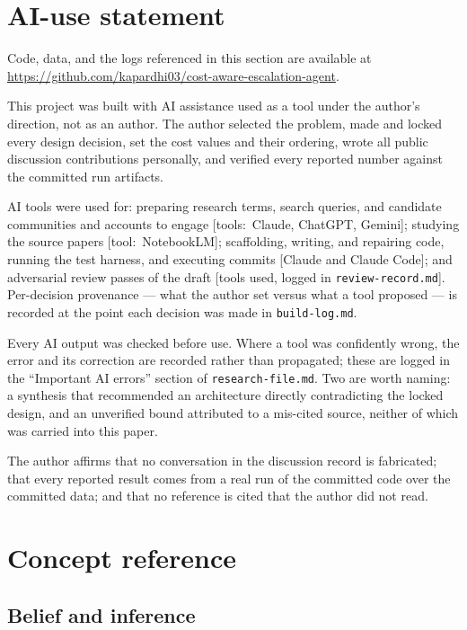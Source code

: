\documentclass{article}
\begin{document}
\section*{AI-use statement}
Code, data, and the logs referenced in this section are available at
\url{https://github.com/kapardhi03/cost-aware-escalation-agent}.

This project was built with AI assistance used as a tool under the author's
direction, not as an author. The author selected the problem, made and locked
every design decision, set the cost values and their ordering, wrote all public
discussion contributions personally, and verified every reported number against
the committed run artifacts.

AI tools were used for: preparing research terms, search queries, and candidate
communities and accounts to engage [tools:\ Claude, ChatGPT, Gemini]; studying the
source papers [tool:\ NotebookLM]; scaffolding, writing, and repairing code,
running the test harness, and executing commits [Claude and Claude Code]; and
adversarial review passes of the draft [tools used, logged in
\texttt{review-record.md}]. Per-decision provenance --- what the author set
versus what a tool proposed --- is recorded at the point each decision was made
in \texttt{build-log.md}.

Every AI output was checked before use. Where a tool was confidently wrong, the
error and its correction are recorded rather than propagated; these are logged in
the ``Important AI errors'' section of \texttt{research-file.md}. Two are worth
naming: a synthesis that recommended an architecture directly contradicting the
locked design, and an unverified bound attributed to a mis-cited source, neither
of which was carried into this paper.

The author affirms that no conversation in the discussion record is fabricated;
that every reported result comes from a real run of the committed code over the
committed data; and that no reference is cited that the author did not read.

\appendix

\section{Concept reference}
\label{app:concepts}

\subsection{Belief and inference}
\end{document}
